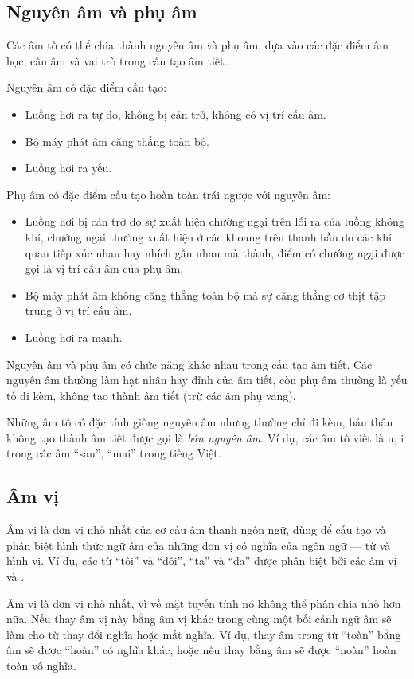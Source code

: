 \documentclass[a4paper,oneside,14pt]{extbook} %
\begin{document}
\subsection{Nguyên âm và phụ âm}

Các âm tố có thể chia thành nguyên âm và phụ âm, dựa vào các đặc điểm
âm học, cấu âm và vai trò trong cấu tạo âm tiết.

Nguyên âm có đặc điểm cấu tạo:
\begin{itemize}
\item Luồng hơi ra tự do, không bị cản trở, không có vị trí cấu âm.
\item Bộ máy phát âm căng thẳng toàn bộ.
\item Luồng hơi ra yếu.
\end{itemize}

Phụ âm có đặc điểm cấu tạo hoàn toàn trái ngược với nguyên âm:
\begin{itemize}
\item Luồng hơi bị cản trở do sự xuất hiện chướng ngại trên lối ra của
  luồng không khí, chướng ngại thường xuất hiện ở các khoang trên
  thanh hầu do các khí quan tiếp xúc nhau hay nhích gần nhau mà thành,
  điểm có chướng ngại được gọi là vị trí cấu âm của phụ âm.
\item Bộ máy phát âm không căng thẳng toàn bộ mà sự căng thẳng cơ thịt
  tập trung ở vị trí cấu âm.
\item Luồng hơi ra mạnh.
\end{itemize}

Nguyên âm và phụ âm có chức năng khác nhau trong cấu tạo âm tiết. Các
nguyên âm thường làm hạt nhân hay đỉnh của âm tiết, còn phụ âm thường
là yếu tố đi kèm, không tạo thành âm tiết (trừ các âm phụ vang).

Những âm tố có đặc tính giống nguyên âm nhưng thường chỉ đi kèm, bản
thân không tạo thành âm tiết được gọi là {\em bán nguyên âm}. Ví dụ,
các âm tố viết là u, i trong các âm ``sau'', ``mai'' trong tiếng Việt.


\subsection{Âm vị}

Âm vị là đơn vị nhỏ nhất của cơ cấu âm thanh ngôn ngữ, dùng để cấu tạo
và phân biệt hình thức ngữ âm của những đơn vị có nghĩa của ngôn ngữ
--- từ và hình vị. Ví dụ, các từ ``tôi'' và ``đôi'', ``ta'' và ``đa''
được phân biệt bởi các âm vị  và .

Âm vị là đơn vị nhỏ nhất, vì về mặt tuyến tính nó không thể phân chia
nhỏ hơn nữa. Nếu thay âm vị này bằng âm vị khác trong cùng một bối
cảnh ngữ âm sẽ làm cho từ thay đổi nghĩa hoặc mất nghĩa. Ví dụ, thay
âm  trong từ ``toàn'' bằng âm  sẽ được
``hoàn'' có nghĩa khác, hoặc nếu thay bằng âm  sẽ được
``noàn'' hoàn toàn vô nghĩa.
\end{document}
